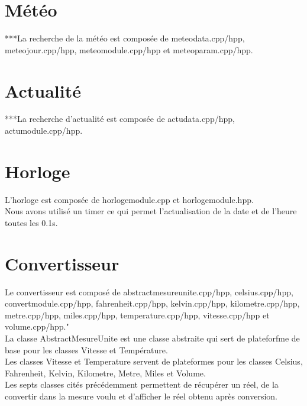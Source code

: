 \documentclass[12pt]{report}
\begin{document}
  \section{Météo}
    ***La recherche de la météo est composée de meteodata.cpp/hpp, meteojour.cpp/hpp, meteomodule.cpp/hpp et meteoparam.cpp/hpp.\\
  \section{Actualité}
    ***La recherche d'actualité est composée de actudata.cpp/hpp, actumodule.cpp/hpp.\\
  \section{Horloge}
    L'horloge est composée de horlogemodule.cpp et horlogemodule.hpp.\\
    Nous avons utilisé un timer ce qui permet l'actualisation de la date et de l'heure toutes les 0.1s.\\
  \section{Convertisseur}
    Le convertisseur est composé de abstractmesureunite.cpp/hpp, celsius.cpp/hpp, convertmodule.cpp/hpp, fahrenheit.cpp/hpp, kelvin.cpp/hpp, kilometre.cpp/hpp, metre.cpp/hpp, miles.cpp/hpp, temperature.cpp/hpp, vitesse.cpp/hpp et volume.cpp/hpp."\\
    La classe AbstractMesureUnite est une classe abstraite qui sert de plateforfme de base pour les classes Vitesse et Température.\\
    Les classes Vitesse et Temperature servent de plateformes pour les classes Celsius, Fahrenheit, Kelvin, Kilometre, Metre, Miles et Volume.\\
    Les septs classes cités précédemment permettent de récupérer un réel, de la convertir dans la mesure voulu et d'afficher le réel obtenu après conversion.
\end{document}
